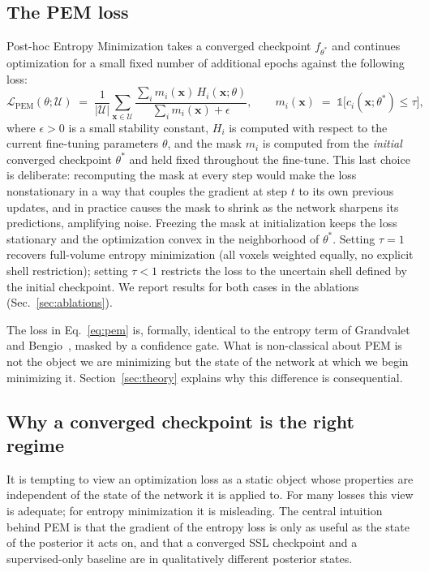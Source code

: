 \subsection{The PEM loss}
\label{sec:method:loss}

Post-hoc Entropy Minimization takes a converged checkpoint $f_{\theta^*}$ and continues optimization for a small fixed number of additional epochs against the following loss:
\begin{equation}
\mathcal{L}_{\mathrm{PEM}}(\theta; \mathcal{U}) \;=\; \frac{1}{|\mathcal{U}|} \sum_{\mathbf{x} \in \mathcal{U}} \frac{\sum_i m_i(\mathbf{x})\, H_i(\mathbf{x}; \theta)}{\sum_i m_i(\mathbf{x}) + \epsilon},
\qquad
m_i(\mathbf{x}) \;=\; \mathbb{1}\!\big[c_i(\mathbf{x}; \theta^*) \le \tau\big],
\label{eq:pem}
\end{equation}
where $\epsilon > 0$ is a small stability constant, $H_i$ is computed with respect to the current fine-tuning parameters $\theta$, and the mask $m_i$ is computed from the \emph{initial} converged checkpoint $\theta^*$ and held fixed throughout the fine-tune. This last choice is deliberate: recomputing the mask at every step would make the loss nonstationary in a way that couples the gradient at step $t$ to its own previous updates, and in practice causes the mask to shrink as the network sharpens its predictions, amplifying noise. Freezing the mask at initialization keeps the loss stationary and the optimization convex in the neighborhood of $\theta^*$. Setting $\tau\!=\!1$ recovers full-volume entropy minimization (all voxels weighted equally, no explicit shell restriction); setting $\tau\!<\!1$ restricts the loss to the uncertain shell defined by the initial checkpoint. We report results for both cases in the ablations (Sec.~\ref{sec:ablations}).

The loss in Eq.~\ref{eq:pem} is, formally, identical to the entropy term of Grandvalet and Bengio~\cite{grandvalet2004entropy}, masked by a confidence gate. What is non-classical about PEM is not the object we are minimizing but the state of the network at which we begin minimizing it. Section~\ref{sec:theory} explains why this difference is consequential.

\subsection{Why a converged checkpoint is the right regime}
\label{sec:method:intuition}

It is tempting to view an optimization loss as a static object whose properties are independent of the state of the network it is applied to. For many losses this view is adequate; for entropy minimization it is misleading. The central intuition behind PEM is that the gradient of the entropy loss is only as useful as the state of the posterior it acts on, and that a converged SSL checkpoint and a supervised-only baseline are in qualitatively different posterior states.

